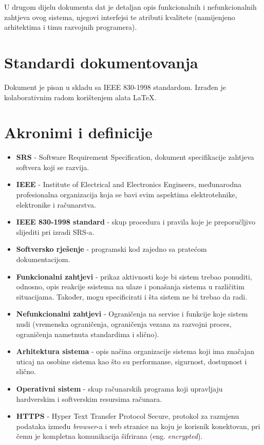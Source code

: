 U drugom dijelu dokumenta dat je detaljan opis funkcionalnih i nefunkcionalnih zahtjeva ovog sistema, njegovi interfejsi te atributi kvalitete (namijenjeno arhitektima i timu razvojnih programera).

\section{Standardi dokumentovanja}

Dokument je pisan u skladu sa IEEE 830-1998 standardom. Izrađen je kolaborativnim radom korištenjem alata \LaTeX.

\section{Akronimi i definicije}

\begin{itemize}
    \item \textbf{SRS} - Software Requirement Specification, dokument specifikacije zahtjeva softvera koji se razvija.
    \item \textbf{IEEE} - Institute of Electrical and Electronics Engineers, međunarodna profesionalna organizacija koja se bavi svim aspektima elektrotehnike, elektronike i računarstva.
    \item \textbf{IEEE 830-1998 standard} - skup procedura i pravila koje je preporučljivo slijediti pri izradi SRS-a.
    \item \textbf{Softversko rješenje} - programski kod zajedno sa pratećom dokumentacijom.
    \item \textbf{Funkcionalni zahtjevi} - prikaz aktivnosti koje bi sistem trebao ponuditi, odnosno, opis reakcije ssistema na ulaze i ponašanja sistema u različitim situacijama. Također, mogu specificirati i šta sistem ne bi trebao da radi.
    \item \textbf{Nefunkcionalni zahtjevi} - Ograničenja na servise i funkcije koje sistem nudi (vremenska ograničenja, ograničenja vezana za razvojni proces, ograničenja nametnuta standardima i slično).
    \item \textbf{Arhitektura sistema} - opis načina organizacije sistema koji ima značajan uticaj na osobine sistema kao što su performanse, sigurnost, dostupnost i slično.
    \item \textbf{Operativni sistem} - skup računarskih programa koji upravljaju hardverskim i softverskim resursima računara.
    \item \textbf{HTTPS} - Hyper Text Transfer Protocol Secure, protokol za razmjenu podataka između  \textit{browser}-a i web stranice na koju je korisnik konektovan, pri čemu je kompletna komunikacija šifrirana (eng. \textit{encrypted}).

\end{itemize}
